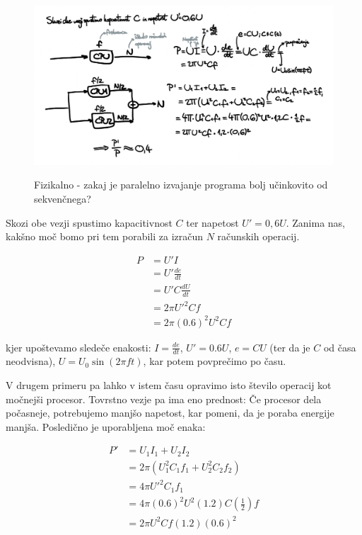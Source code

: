 \documentclass[mat1, tisk]{fmfdelo}
\begin{document}
\begin{figure}[h!]
  \centering
  \caption{Fizikalno - zakaj je paralelno izvajanje programa bolj učinkovito od sekvenčnega?}
  \includegraphics[width=13cm]{slike/paralelizacija-fizikalno.png}
  \label{fig:paralelizacija-fizikalno}
\end{figure}

Skozi obe vezji spustimo kapacitivnost $C$ ter napetost $U'=0,6U$. Zanima nas, kakšno moč bomo
pri tem porabili za izračun $N$ računskih operacij.

\begin{align*}
  P &= U'I \\
  &= U' \frac{de}{dt} \\
  &= U'C \frac{dU}{dt} \\
  &= 2\pi U'^2Cf \\
  &= 2\pi (0.6)^2U^2Cf
\end{align*}
  
kjer upoštevamo sledeče enakosti: $I = \frac{de}{dt}$, $U' = 0.6U$, $e = CU$ (ter da je $C$ od časa neodvisna),
$U = U_0\sin(2\pi ft)$, kar potem povprečimo po času.

V drugem primeru pa lahko v istem času opravimo isto število operacij kot močnejši procesor. Tovrstno vezje pa ima
eno prednost: Če procesor dela počasneje, potrebujemo manjšo napetost, kar pomeni, da je poraba energije manjša.
Posledično je uporabljena moč enaka:

\begin{align*}
  P' &= U_1I_1 + U_2I_2 \\
  &= 2\pi (U_1^2C_1f_1 + U_2^2C_2f_2) \\
  &= 4\pi U'^2C_1f_1 \\
  &= 4\pi (0.6)^2U^2(1.2)C\left(\frac{1}{2}\right)f \\
  &= 2\pi U^2Cf(1.2)(0.6)^2
\end{align*}
\end{document}
